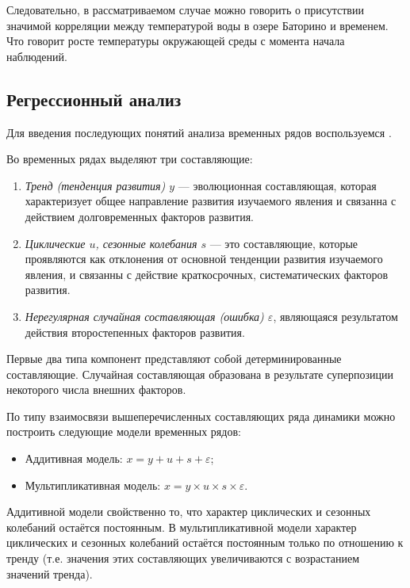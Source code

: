 Следовательно, в рассматриваемом случае можно говорить о присутствии значимой корреляции между температурой воды в озере Баторино и временем. Что говорит росте температуры окружающей среды с момента начала наблюдений.


\subsection{Регрессионный анализ} %
\label{sec:regr_analysis}

Для введения последующих понятий анализа временных рядов воспользуемся \cite{Eddows1997}.

Во временных рядах выделяют три составляющие:
\begin{enumerate}
	\item \textit{Тренд (тенденция развития) $ y $} --- эволюционная составляющая, которая характеризует общее направление развития изучаемого явления и связанна с действием долговременных факторов развития.
	\item \textit{Циклические $ u $, сезонные колебания $ s $} --- это составляющие, которые проявляются как отклонения от основной тенденции развития изучаемого явления, и связанны с действие краткосрочных, систематических факторов развития.
	\item \textit{Нерегулярная случайная составляющая (ошибка) $ \varepsilon $}, являющаяся результатом действия второстепенных факторов развития.
\end{enumerate}
Первые два типа компонент представляют собой детерминированные составляющие. Случайная составляющая образована в результате суперпозиции некоторого числа внешних факторов.

По типу взаимосвязи вышеперечисленных составляющих ряда динамики можно построить следующие модели временных рядов:
\begin{itemize}
	\item Аддитивная модель: $ x = y + u + s + \varepsilon $;
	\item Мультипликативная модель: $x = y \times u \times s \times \varepsilon$.
\end{itemize}

Аддитивной модели свойственно то, что характер циклических и сезонных колебаний остаётся постоянным. В мультипликативной модели характер циклических и сезонных колебаний остаётся постоянным только по отношению к тренду (т.е. значения этих составляющих увеличиваются с возрастанием значений тренда).

